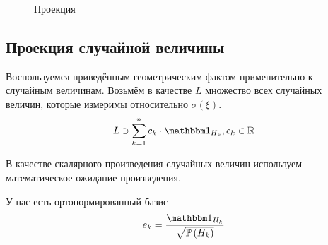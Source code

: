 \begin{figure}[h!]
  \center
  \caption{Проекция}
  \label{fig:tikz:vectorProjection}
\end{figure}

\subsection{Проекция случайной величины}
Воспользуемся приведённым геометрическим фактом применительно к случайным
величинам.
Возьмём в качестве $L$ множество всех случайных величин, которые
измеримы относительно $\sigma\left( \xi \right)$.
$$L \ni \sum_{k=1}^n c_k \cdot \indicatorof{H_k}, c_k \in \mathbb{R}$$

В качестве скалярного произведения случайных величин
используем математическое ожидание произведения.

\begin{comment}
Оказывается, $H_k$ действительно ортогональны
$$k_1 \neq k_2
  \Rightarrow H_{k_1} \cap H_{k_2} = \emptyset
  \Rightarrow
  \Mean{ \indicatorof{H_{k_1}}\cdot \indicatorof{H_{k_1}} } = 0$$

Теперь нужно нормировать эти базисные вектора,
а для этого их надо поделить на их нормы.
В нашем пространстве норма порождена скалярным произведением,
то есть
$$\left\| x \right\| = \sqrt{\left( x,x \right)}
  = \sqrt{\Mean{ x \cdot x }}
  = \sqrt{\Mean{ x^2 }}, x \in L$$

Теперь у нас есть всё необходимое для того,
чтобы представить ортонормированный базис.
Начнём преобразования $H_k$
$$e_k = \frac{\indicatorof{H_k}}
  {\sqrt{\mean{\left( \indicatorof{H_k} \right)^2}}}$$

Поскольку индикатор может принимать лишь одно из двух значений $0$ или $1$,
а их квадраты равны им самим, то в формуле квадрат тоже можно убрать
$$e_k = \frac{\indicatorof{H_k}}{\sqrt{\mean{\indicatorof{H_k}}}}$$

Также помним, что математическое ожидание в знаменателе есть ни что иное,
как вероятность события $H_k$,
и теперь у нас есть красивый ортонормированный базис
\end{comment}
У нас есть ортонормированный базис
\begin{equation}\label{orthonormalBasis}
e_k = \frac{\indicatorof{H_k}}{\sqrt{\probability{H_k}}}
\end{equation}

